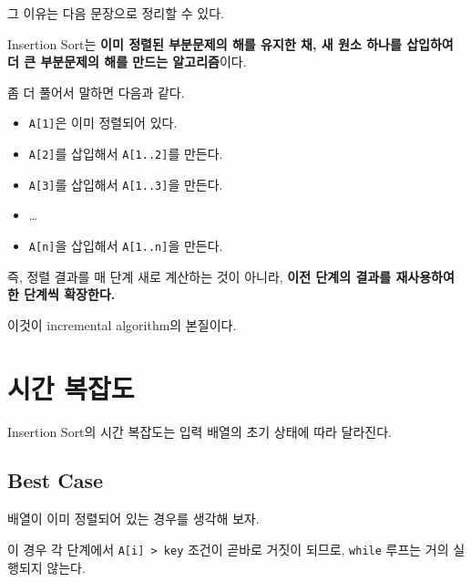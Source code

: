 \documentclass[
  korean,
]{article}
\begin{document}
그 이유는 다음 문장으로 정리할 수 있다.

\begin{tcolorbox}[enhanced jigsaw, arc=.35mm, bottomrule=.15mm, bottomtitle=1mm, breakable, colback=white, colbacktitle=quarto-callout-tip-color!10!white, colframe=quarto-callout-tip-color-frame, coltitle=black, left=2mm, leftrule=.75mm, opacityback=0, opacitybacktitle=0.6, rightrule=.15mm, title=\textcolor{quarto-callout-tip-color}{\faLightbulb}\hspace{0.5em}{한 문장 요약}, titlerule=0mm, toprule=.15mm, toptitle=1mm]

Insertion Sort는 \textbf{이미 정렬된 부분문제의 해를 유지한 채, 새 원소
하나를 삽입하여 더 큰 부분문제의 해를 만드는 알고리즘}이다.\\

\end{tcolorbox}

좀 더 풀어서 말하면 다음과 같다.

\begin{itemize}
\item
  \texttt{A{[}1{]}}은 이미 정렬되어 있다.
\item
  \texttt{A{[}2{]}}를 삽입해서 \texttt{A{[}1..2{]}}를 만든다.
\item
  \texttt{A{[}3{]}}를 삽입해서 \texttt{A{[}1..3{]}}을 만든다.
\item
  \ldots{}
\item
  \texttt{A{[}n{]}}을 삽입해서 \texttt{A{[}1..n{]}}을 만든다.
\end{itemize}

즉, 정렬 결과를 매 단계 새로 계산하는 것이 아니라, \textbf{이전 단계의
결과를 재사용하여 한 단계씩 확장한다.}

이것이 incremental algorithm의 본질이다.

\section{시간 복잡도}\label{uxc2dcuxac04-uxbcf5uxc7a1uxb3c4}

Insertion Sort의 시간 복잡도는 입력 배열의 초기 상태에 따라 달라진다.

\subsection{Best Case}\label{best-case}

배열이 이미 정렬되어 있는 경우를 생각해 보자.

이 경우 각 단계에서 \texttt{A{[}i{]}\ \textgreater{}\ key} 조건이 곧바로
거짓이 되므로, \texttt{while} 루프는 거의 실행되지 않는다.
\end{document}
